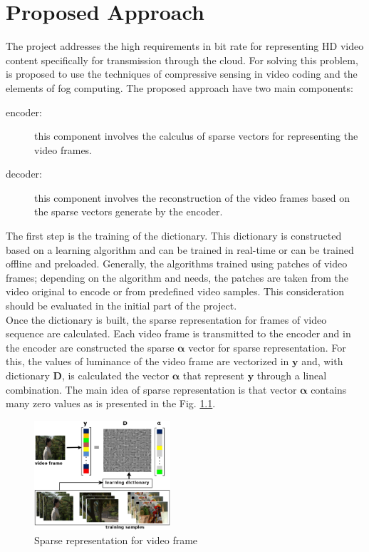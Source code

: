 \chapter{Proposed Approach}

The project addresses the high requirements in bit rate for representing HD video content specifically for transmission through the cloud. For solving this problem, is proposed to use the techniques of compressive sensing in video coding and the elements of fog computing. The proposed approach have two main components:
\begin{description}
\item[encoder:] this component involves the calculus of sparse vectors for representing the video frames.
\item[decoder:] this component involves the reconstruction of the video frames based on the sparse vectors generate by the encoder.
\end{description}

The first step is the training of the dictionary. This dictionary is constructed based on a learning algorithm and can be trained in real-time or can be trained offline and preloaded. Generally, the algorithms trained using patches of video frames; depending on the algorithm and needs, the patches are taken from the video original to encode or from predefined video samples. This consideration should be evaluated in the initial part of the project. \\

Once the dictionary is built, the sparse representation for frames of video sequence are calculated. Each video frame is transmitted to the encoder and in the encoder are constructed the sparse $\boldsymbol{\alpha}$ vector for sparse representation. For this, the values of luminance of the video frame are vectorized in $\boldsymbol{y}$ and, with dictionary $\boldsymbol{D}$, is calculated the vector $\boldsymbol{\alpha}$ that represent $\boldsymbol{y}$ through a lineal combination. The main idea of sparse representation is that vector $\boldsymbol{\alpha}$ contains many zero values as is presented in the Fig. \ref{fig:proposed_sparse}. \\

\begin{figure}[!h]
\centering
\includegraphics[width=0.45\textwidth]{images/proposed_sparse.eps}
\caption{Sparse representation for video frame}
\label{fig:proposed_sparse}
\end{figure}

